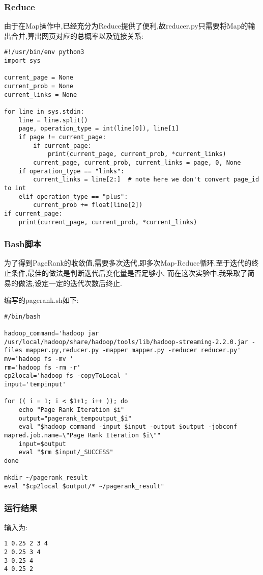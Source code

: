 \documentclass[a4paper]{article}
\begin{document}
            \subsubsection{Reduce}
由于在Map操作中,已经充分为Reduce提供了便利,故reducer.py只需要将Map的输出合并,算出网页对应的总概率以及链接关系:
\begin{verbatim}
#!/usr/bin/env python3
import sys

current_page = None
current_prob = None
current_links = None

for line in sys.stdin:
    line = line.split()
    page, operation_type = int(line[0]), line[1]
    if page != current_page:
        if current_page:
            print(current_page, current_prob, *current_links)
        current_page, current_prob, current_links = page, 0, None
    if operation_type == "links":
        current_links = line[2:]  # note here we don't convert page_id to int
    elif operation_type == "plus":
        current_prob += float(line[2])
if current_page:
    print(current_page, current_prob, *current_links)
\end{verbatim}
        \subsubsection{Bash脚本}
为了得到PageRank的收敛值,需要多次迭代,即多次Map-Reduce循环.至于迭代的终止条件,最佳的做法是判断迭代后变化量是否足够小,
而在这次实验中,我采取了简易的做法,设定一定的迭代次数后终止.

编写的pagerank.sh如下:
\begin{verbatim}
#/bin/bash

hadoop_command='hadoop jar /usr/local/hadoop/share/hadoop/tools/lib/hadoop-streaming-2.2.0.jar -files mapper.py,reducer.py -mapper mapper.py -reducer reducer.py'
mv='hadoop fs -mv '
rm='hadoop fs -rm -r'
cp2local='hadoop fs -copyToLocal '
input='tempinput'

for (( i = 1; i < $1+1; i++ )); do
    echo "Page Rank Iteration $i"
    output="pagerank_tempoutput_$i"
    eval "$hadoop_command -input $input -output $output -jobconf mapred.job.name=\"Page Rank Iteration $i\""
    input=$output
    eval "$rm $input/_SUCCESS"
done

mkdir ~/pagerank_result
eval "$cp2local $output/* ~/pagerank_result"
\end{verbatim}
        \subsubsection{运行结果}
输入为:
\begin{verbatim}
1 0.25 2 3 4
2 0.25 3 4
3 0.25 4
4 0.25 2
\end{verbatim}
\end{document}
